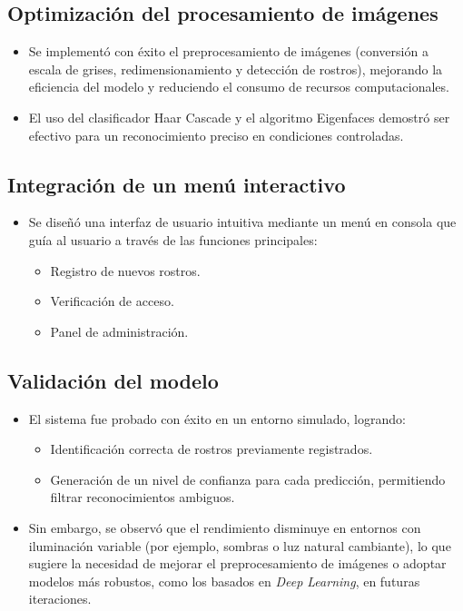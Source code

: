 \documentclass[12pt]{article}
\begin{document}
{\subsection*{Optimización del procesamiento de imágenes}
\begin{itemize}
    \item Se implementó con éxito el preprocesamiento de imágenes (conversión a escala de grises, redimensionamiento y detección de rostros), mejorando la eficiencia del modelo y reduciendo el consumo de recursos computacionales.
    \item El uso del clasificador Haar Cascade y el algoritmo Eigenfaces demostró ser efectivo para un reconocimiento preciso en condiciones controladas.
\end{itemize}

\subsection*{Integración de un menú interactivo}
\begin{itemize}
    \item Se diseñó una interfaz de usuario intuitiva mediante un menú en consola que guía al usuario a través de las funciones principales:
    \begin{itemize}
        \item Registro de nuevos rostros.
        \item Verificación de acceso.
        \item Panel de administración.
    \end{itemize}
\end{itemize}

\subsection*{Validación del modelo}
\begin{itemize}
    \item El sistema fue probado con éxito en un entorno simulado, logrando:
    \begin{itemize}
        \item Identificación correcta de rostros previamente registrados.
        \item Generación de un nivel de confianza para cada predicción, permitiendo filtrar reconocimientos ambiguos.
    \end{itemize}
    \item Sin embargo, se observó que el rendimiento disminuye en entornos con iluminación variable (por ejemplo, sombras o luz natural cambiante), lo que sugiere la necesidad de mejorar el preprocesamiento de imágenes o adoptar modelos más robustos, como los basados en \textit{Deep Learning}, en futuras iteraciones.
\end{itemize}

}
\end{document}

